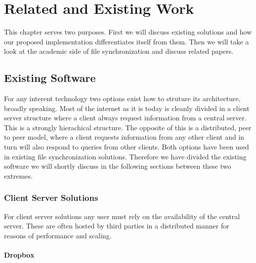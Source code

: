 \chapter{Related and Existing Work}
\label{chap:related}

This chapter serves two purposes.
First we will discuss existing solutions and how our proposed implementation differentiates itself from them.
Then we will take a look at the academic side of file synchronization and discuss related papers.

\section{Existing Software}

For any interent technology two options exist how to struture its architecture, broadly speaking.
Most of the internet as it is today is cleanly divided in a client server structure where a client always request information from a central server.
This is a strongly hierachical structure.
The opposite of this is a distributed, peer to peer model, where a client requests information from any other client and in turn will also respond to queries from other clients.
Both options have been used in existing file synchronization solutions.
Therefore we have divided the existing software we will shortly discuss in the following sections between these two extremes.

\subsection{Client Server Solutions}

For client server solutions any user must rely on the availability of the central server.
These are often hosted by third parties in a distributed manner for reasons of performance and scaling.

\subsubsection{Dropbox}

